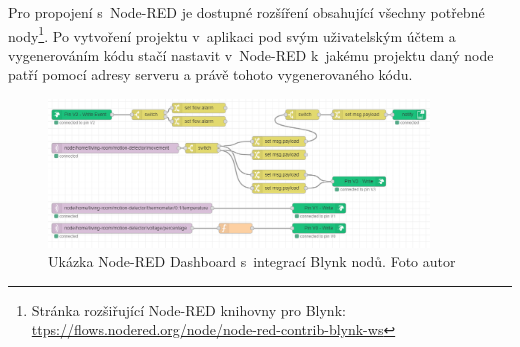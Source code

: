 Pro propojení s~Node-RED je dostupné rozšíření obsahující všechny potřebné nody\footnote{Stránka rozšiřující Node-RED knihovny pro Blynk: \url{ttps://flows.nodered.org/node/node-red-contrib-blynk-ws}}. Po vytvoření projektu v~aplikaci pod svým uživatelským účtem a vygenerováním kódu stačí nastavit v~Node-RED k~jakému projektu daný node patří pomocí adresy serveru a právě tohoto vygenerovaného kódu.

\begin{figure}[H]
  \centering
  \includegraphics[width=0.9\textwidth]{obrazky-figures/blynk/blynkExampleFlow.PNG}
  \caption{Ukázka Node-RED Dashboard s~integrací Blynk nodů. Foto autor}
  \label{nodeRedBlynkExample}
\end{figure}

